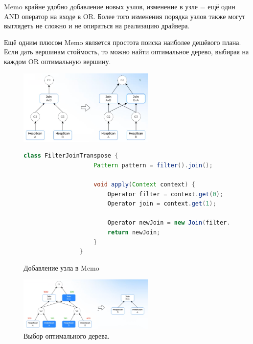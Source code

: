 \documentclass[11pt]{article}
\begin{document}
    Memo крайне удобно добавление новых узлов, изменение в узле = ещё один AND оператор на входе в OR\@.
    Более того изменения порядка узлов также могут выглядеть не сложно и не опираться на реализацию драйвера.

    Ещё одним плюсом Memo является простота поиска наиболее дешёвого плана.
    Если дать вершинам стоймость, то можно найти оптимальное дерево, выбирая на каждом OR оптимальную вершину.
    
    \begin{figure}[h!]
        \begin{minipage}[t]{\linewidth}
            \centering
            \includegraphics[width=0.6\textwidth]{Pictures/Memo/Добавление узла в Memo}
            \caption{Добавление узла в Memo}
        \end{minipage}
        \begin{minipage}[b]{\linewidth}
            \begin{lstlisting}[language=Java,label={lst:filter_join_transpose},caption={Пример правила перестановки}]
                class FilterJoinTranspose {
                    Pattern pattern = filter().join();

                    void apply(Context context) {
                        Operator filter = context.get(0);
                        Operator join = context.get(1);

                        Operator newJoin = new Join(filter.replace(join.left()), join.right());
                        return newJoin;
                    }
                }
            \end{lstlisting}
        \end{minipage}
        \label{fig:adding_to_memo}
    \end{figure}

    \begin{figure}[h!]
        \centering
        \includegraphics[width=0.6\textwidth]{Pictures/Memo/Стоймость в Memo}
        \caption{Выбор оптимального дерева.}
        \label{fig:cost_in_memo}
    \end{figure}
\end{document}
